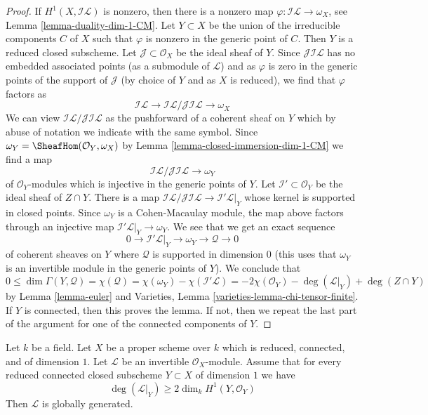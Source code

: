 \begin{proof}
If $H^1(X, \mathcal{I}\mathcal{L})$ is nonzero, then there is a nonzero map
$\varphi : \mathcal{I}\mathcal{L} \to \omega_X$, see
Lemma \ref{lemma-duality-dim-1-CM}. Let $Y \subset X$
be the union of the irreducible components $C$ of $X$ such that
$\varphi$ is nonzero in the generic point of $C$.
Then $Y$ is a reduced closed subscheme.
Let $\mathcal{J} \subset \mathcal{O}_X$ be the ideal sheaf of $Y$.
Since $\mathcal{J}\mathcal{I}\mathcal{L}$
has no embedded associated points
(as a submodule of $\mathcal{L}$) and as $\varphi$ is zero
in the generic points of the support of $\mathcal{J}$
(by choice of $Y$ and as $X$ is reduced), we find that
$\varphi$ factors as
$$
\mathcal{I}\mathcal{L} \to
\mathcal{I}\mathcal{L}/\mathcal{J}\mathcal{I}\mathcal{L} \to \omega_X
$$
We can view $\mathcal{I}\mathcal{L}/\mathcal{J}\mathcal{I}\mathcal{L}$
as the pushforward of a coherent sheaf on $Y$ which by abuse of
notation we indicate with the same symbol.
Since $\omega_Y = \SheafHom(\mathcal{O}_Y, \omega_X)$
by Lemma \ref{lemma-closed-immersion-dim-1-CM}
we find a map
$$
\mathcal{I}\mathcal{L}/
\mathcal{J}\mathcal{I}\mathcal{L} 
\to \omega_Y
$$
of $\mathcal{O}_Y$-modules which is injective in the generic points
of $Y$. Let $\mathcal{I}' \subset \mathcal{O}_Y$ be the ideal
sheaf of $Z \cap Y$. There is a map
$\mathcal{I}\mathcal{L}/\mathcal{J}\mathcal{I}\mathcal{L} \to
\mathcal{I}'\mathcal{L}|_Y$ whose kernel is supported in closed points.
Since $\omega_Y$ is a Cohen-Macaulay module, the map above
factors through an injective map $\mathcal{I}'\mathcal{L}|_Y \to
\omega_Y$. We see that we get
an exact sequence
$$
0 \to \mathcal{I}'\mathcal{L}|_Y \to \omega_Y \to \mathcal{Q} \to 0
$$
of coherent sheaves on $Y$ where $\mathcal{Q}$ is supported in dimension $0$
(this uses that $\omega_Y$ is an invertible module in the generic points
of $Y$). We conclude that
$$
0 \leq \dim \Gamma(Y, \mathcal{Q}) =
\chi(\mathcal{Q}) = \chi(\omega_Y) - \chi(\mathcal{I}'\mathcal{L}) =
-2\chi(\mathcal{O}_Y) - \deg(\mathcal{L}|_Y) + \deg(Z \cap Y)
$$
by Lemma \ref{lemma-euler} and
Varieties, Lemma \ref{varieties-lemma-chi-tensor-finite}.
If $Y$ is connected, then this proves the lemma.
If not, then we repeat the last part of the argument
for one of the connected components of $Y$.
\end{proof}

\begin{lemma}
\label{lemma-global-generation}
Let $k$ be a field. Let $X$ be a proper scheme over $k$
which is reduced, connected, and of dimension $1$.
Let $\mathcal{L}$ be an invertible $\mathcal{O}_X$-module.
Assume that for every reduced connected closed subscheme
$Y \subset X$ of dimension $1$ we have
$$
\deg(\mathcal{L}|_Y) \geq 2\dim_k H^1(Y, \mathcal{O}_Y)
$$
Then $\mathcal{L}$ is globally generated.
\end{lemma}

